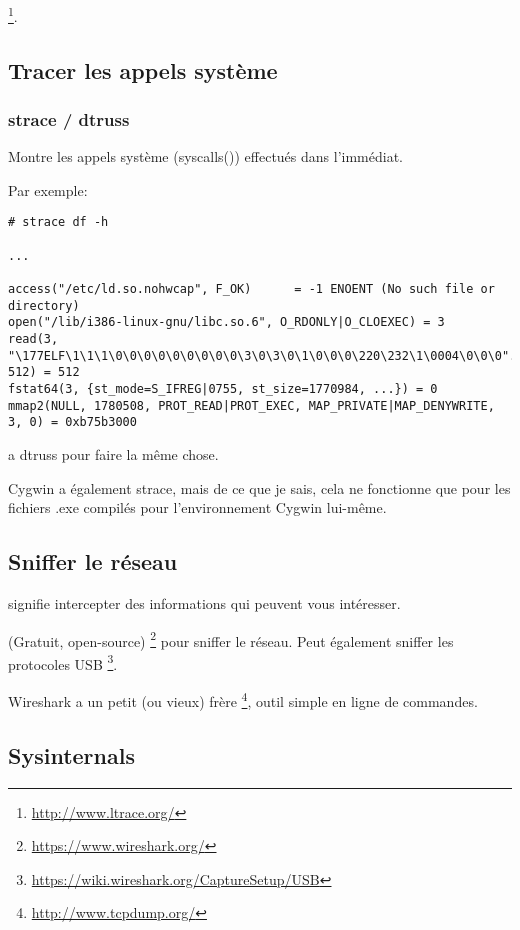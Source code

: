 \footnote{\url{http://www.ltrace.org/}}.

\subsection{Tracer les appels système}

\label{strace}
\subsubsection{strace / dtruss}

Montre les appels système (syscalls()) effectués dans l'immédiat.

Par exemple:

\begin{lstlisting}
# strace df -h

...

access("/etc/ld.so.nohwcap", F_OK)      = -1 ENOENT (No such file or directory)
open("/lib/i386-linux-gnu/libc.so.6", O_RDONLY|O_CLOEXEC) = 3
read(3, "\177ELF\1\1\1\0\0\0\0\0\0\0\0\0\3\0\3\0\1\0\0\0\220\232\1\0004\0\0\0"..., 512) = 512
fstat64(3, {st_mode=S_IFREG|0755, st_size=1770984, ...}) = 0
mmap2(NULL, 1780508, PROT_READ|PROT_EXEC, MAP_PRIVATE|MAP_DENYWRITE, 3, 0) = 0xb75b3000
\end{lstlisting}

\myindex{\MacOSX}
\MacOSX a dtruss pour faire la même chose.

Cygwin a également strace, mais de ce que je sais, cela ne fonctionne que pour les fichiers .exe
compilés pour l'environnement Cygwin lui-même.

\subsection{Sniffer le réseau}

 signifie intercepter des informations qui peuvent vous intéresser.

(Gratuit, open-source) \footnote{\url{https://www.wireshark.org/}} pour sniffer le réseau.
Peut également sniffer les protocoles USB \footnote{\url{https://wiki.wireshark.org/CaptureSetup/USB}}.

Wireshark a un petit (ou vieux) frère \footnote{\url{http://www.tcpdump.org/}}, outil simple en ligne de commandes.

\subsection{Sysinternals}

